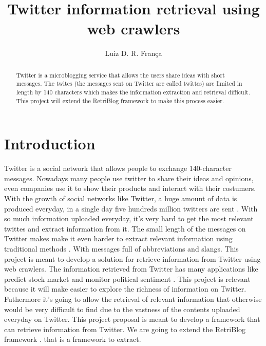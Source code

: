 \documentclass[12pt]{article}
\title{Twitter information retrieval using web crawlers}
\author{Luiz D. R. Fran\c{c}a\inst{1}}
\begin{document}
 

\maketitle

\begin{abstract} 
Twitter is a microblogging service that allows the users share ideas with short messages. The twites (the messages sent on Twitter are called twittes) are limited in length by 140 characters which makes the information extraction and retrieval difficult. This project will extend the RetriBlog framework \cite{Ferreira:13} to make this process easier. 
\end{abstract}

\section{Introduction}

Twitter is a social network that allows people to exchange 140-character messages. Nowadays many people use twitter to share their ideas and opinions, even companies use it to show their products and interact with their costumers. With the growth of social networks like Twitter, a huge amount of data is produced everyday, in a single day five hundreds million twitters are sent \cite{NetLiveStats}.  With so much information uploaded everyday, it's very hard to get the most relevant twittes and extract information from it. The small length of the messages on Twitter makes make it even harder to extract relevant information using traditional methods \cite{Sriram:10}. With messages full of abbreviations and slangs. This project is meant to develop a solution for retrieve information from Twitter using web crawlers.
\linebreak
The information retrieved from Twitter has many applications like predict stock market \cite{Bollen:11} and monitor political sentiment \cite{Bermingham:11}.
This project is relevant because it will make easier to explore the richness of information on Twitter. Futhermore it's going to allow the retrieval of relevant information that otherwise would be very difficult to find due to the vastness of the contents uploaded everyday on Twitter. 
\linebreak
This project proposal is meant to develop a framework that can retrieve information from Twitter. We are going to extend the RetriBlog framework \cite{Ferreira:13}. that is a framework to extract.
\end{document}
